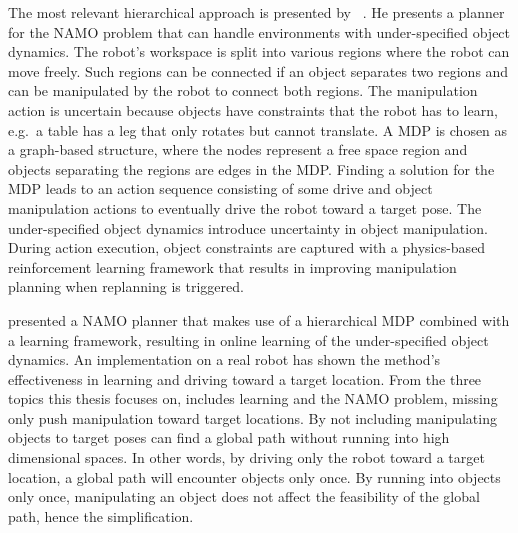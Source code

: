 The most relevant hierarchical approach is presented by \citeauthor{scholz_navigation_2016}~\cite{scholz_navigation_2016}. He presents a planner for the \ac{NAMO} problem that can handle environments with under-specified object dynamics. The robot's workspace is split into various regions where the robot can move freely. Such regions can be connected if an object separates two regions and can be manipulated by the robot to connect both regions. The manipulation action is uncertain because objects have constraints that the robot has to learn, e.g.~a table has a leg that only rotates but cannot translate. A \ac{MDP} is chosen as a graph-based structure, where the nodes represent a free space region and objects separating the regions are edges in the \ac{MDP}. Finding a solution for the \ac{MDP} leads to an action sequence consisting of some drive and object manipulation actions to eventually drive the robot toward a target pose. The under-specified object dynamics introduce uncertainty in object manipulation. During action execution, object constraints are captured with a physics-based reinforcement learning framework that results in improving manipulation planning when replanning is triggered.\bs

\citeauthor{scholz_navigation_2016} presented a \ac{NAMO} planner that makes use of a hierarchical \ac{MDP} combined with a learning framework, resulting in online learning of the under-specified object dynamics. An implementation on a real robot has shown the method's effectiveness in learning and driving toward a target location. From the three topics this thesis focuses on, \citeauthor{scholz_navigation_2016} includes learning and the \ac{NAMO} problem, missing only push manipulation toward target locations. By not including manipulating objects to target poses \citeauthor{scholz_navigation_2016} can find a global path without running into high dimensional spaces. In other words, by driving only the robot toward a target location, a global path will encounter objects only once. By running into objects only once, manipulating an object does not affect the feasibility of the global path, hence the simplification.\bs


